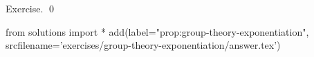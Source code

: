 
\begin{prop}
  \label{prop:group-theory-exponentiation}
  
\end{prop}
\proof
Exercise.
\qed
\begin{python0}
from solutions import *
add(label="prop:group-theory-exponentiation",
    srcfilename='exercises/group-theory-exponentiation/answer.tex') 
\end{python0}
